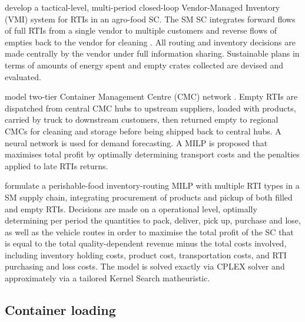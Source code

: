 \autocite{SOYSAL2023101504} develop a tactical-level, multi-period closed-loop Vendor-Managed Inventory (VMI) system for RTIs in an agro-food SC. The SM SC integrates forward flows of full RTIs from a single vendor to multiple customers and reverse flows of empties back to the vendor for cleaning . All routing and inventory decisions are made centrally by the vendor under full information sharing. Sustainable plans in terms of amounts of energy spent and empty crates collected are devised and evaluated.


\autocite{GUO2024104339} model two-tier Container Management Centre (CMC) network . Empty RTIs are dispatched from central CMC hubs to upstream suppliers, loaded with products, carried by truck to downstream customers, then returned empty to regional CMCs for cleaning and storage before being shipped back to central hubs. A neural network is used for demand forecasting. A MILP is proposed that maximises total profit by optimally determining transport costs and the penalties applied to late RTIs returns.


\autocite{Zhang17012024} formulate a perishable-food inventory-routing MILP with multiple RTI types in a SM supply chain, integrating procurement of products and pickup of both filled and empty RTIs. Decisions are made on a operational level, optimally determining per period the quantities to pack, deliver, pick up, purchase and lose, as well as the vehicle routes in order to maximise the total profit of the SC that is equal to the total quality-dependent revenue minus the total costs involved, including inventory holding costs, product cost, transportation costs, and RTI purchasing and loss costs. The model is solved exactly via CPLEX  solver and approximately via a tailored Kernel Search matheuristic.


\subsection{Container loading}

